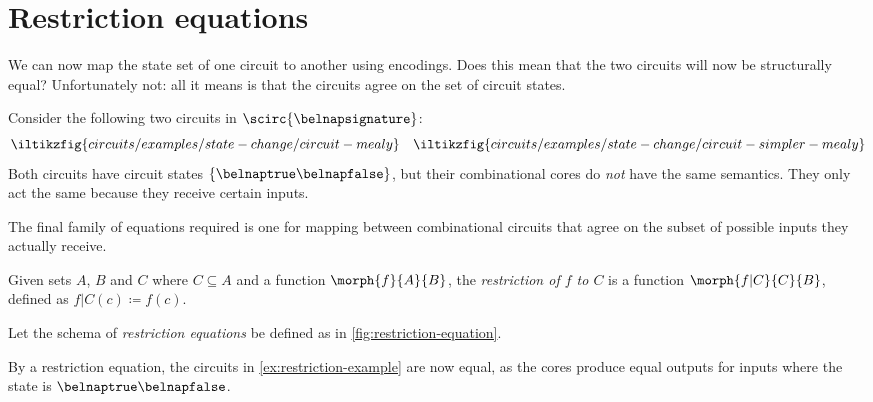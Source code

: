 \section{Restriction equations}\label{sec:restriction}

We can now map the state set of one circuit to another using encodings.
Does this mean that the two circuits will now be structurally equal?
Unfortunately not: all it means is that the circuits agree on the set of
circuit states.

\begin{example}\label{ex:restriction-example}
    Consider the following two circuits in \(\scirc{\belnapsignature}\): \[
        \iltikzfig{circuits/examples/state-change/circuit-mealy}
        \quad
        \iltikzfig{circuits/examples/state-change/circuit-simpler-mealy}
    \]
    Both circuits have circuit states \(\{\belnaptrue\belnapfalse\}\), but their
    combinational cores do \emph{not} have the same semantics.
    They only act the same because they receive certain inputs.
\end{example}

The final family of equations required is one for mapping between combinational
circuits that agree on the subset of possible inputs they actually receive.

\begin{notation}
    Given sets \(A\), \(B\) and \(C\) where \(C \subseteq A\) and a function
    \(\morph{f}{A}{B}\), the \emph{restriction of \(f\) to \(C\)} is a function
    \(\morph{f|C}{C}{B}\), defined as \(f|C(c) \coloneqq f(c)\).
\end{notation}

\begin{definition}
    Let the schema of \emph{restriction equations} be defined as in
    \cref{fig:restriction-equation}.
\end{definition}

\begin{example}
    By a restriction equation, the circuits in \cref{ex:restriction-example} are
    now equal, as the cores produce equal outputs for inputs where the state is
    \(\belnaptrue\belnapfalse\).
\end{example}
